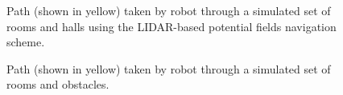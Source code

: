 				\begin{figure}[!h]
					\centering
					\caption{Path (shown in yellow) taken by robot through a simulated set of rooms and halls using the LIDAR-based potential fields navigation scheme.}
					\label{fig::potential_field_results}
				\end{figure}
				\begin{figure}[!h]
					\centering
					\caption{Path (shown in yellow) taken by robot through a simulated set of rooms and obstacles.}
					\label{fig::potential_field_results_obstacles}
				\end{figure}
		
